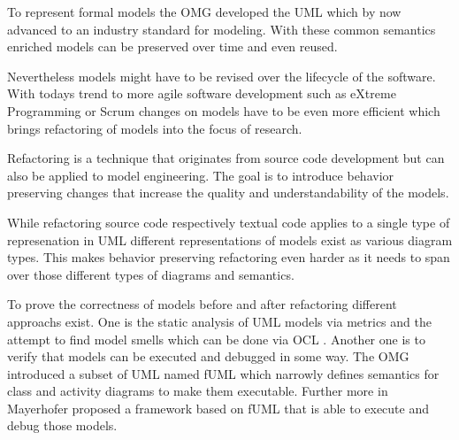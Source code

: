 \documentclass{llncs}
\begin{document}

To represent formal models the OMG developed the UML \cite{man:UML} which by now advanced to an industry standard for modeling. With
these common semantics enriched models can be preserved over time and even reused.


Nevertheless models might have to be revised over the lifecycle of the software. With todays trend to more agile software 
development such as eXtreme Programming \cite{DBLP:journals/computer/Beck99} or Scrum \cite{DBLP:journals/software/RisingJ00} 
changes on models have to be even more efficient which brings refactoring of models into the focus of research.


Refactoring is a technique that originates from source code development but can also be applied to model engineering.
The goal is to introduce behavior preserving changes \cite{mast:REFOOF} that increase the quality and understandability
of the models.


While refactoring source code respectively textual code applies to a single type of represenation in UML different
representations of models exist as various diagram types. This makes behavior preserving refactoring even harder as it
needs to span over those different types of diagrams and semantics.


To prove the correctness of models before and after refactoring different approachs exist. One is the static analysis of
UML models via metrics and the attempt to find model smells \cite{DBLP:conf/models/ArendtTW13} which can be done via
OCL \cite{man:OCL}. Another one is to verify that models can be executed and debugged in some way. The OMG introduced a subset 
of UML named fUML \cite{man:FUML} which narrowly defines semantics for class and activity diagrams to make them executable. 
Further more in \cite{DBLP:conf/icse/Mayerhofer12} Mayerhofer proposed a framework based on fUML that is able to execute
and debug those models.
\end{document}
